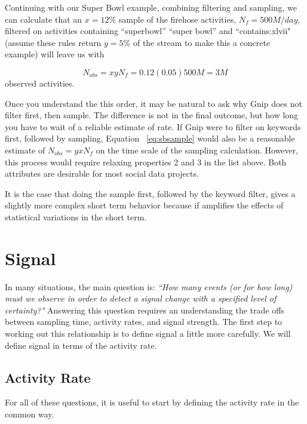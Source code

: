 \documentclass{article}
\begin{document}
Continuing with our Super Bowl example, combining filtering and sampling, we can calculate that an $x=12\%$ sample of the firehose activities, $N_f=500M/day$, filtered on activities containing ``superbowl'' ``super bowl'' and ``contains:xlvii" (assume these rules return $y=5\%$ of the stream to make this a concrete example) will leave us with

\begin{equation}
    \label{eq:sbsample}
    N_{obs} = x y N_f = 0.12 (0.05) 500M = 3M
\end{equation}
observed activities. 

Once you understand the this order, it may be natural to ask why Gnip does not filter first, then sample. The difference is not in the final outcome, but how long you have to wait of a reliable estimate of rate. If Gnip were to filter on keywords first, followed by sampling, Equation ~\ref{eq:sbsample} would also be a reasonable estimate of $N_{obs} = y x N_f$ on the time scale of the sampling calculation. However, this process would require relaxing properties 2 and 3 in the list above. Both attributes are desirable for most social data projects.

It is the case that doing the sample first, followed by the keyword filter, gives a slightly more complex short term behavior because if amplifies the effects of statistical variations in the short term.

\section{Signal} 

In many situations, the main question is: \emph{``How many events (or for how long) must we observe in order to detect a signal change with a specified level of certainty?"} Answering this question requires an understanding the trade offs between sampling time, activity rates, and signal strength.  The first step to working out this relationship is to define signal a little more carefully. We will define signal in terms of the activity rate.

\subsection{Activity Rate} 

For all of these questions, it is useful to start by defining the activity rate in the common way.
\end{document}
